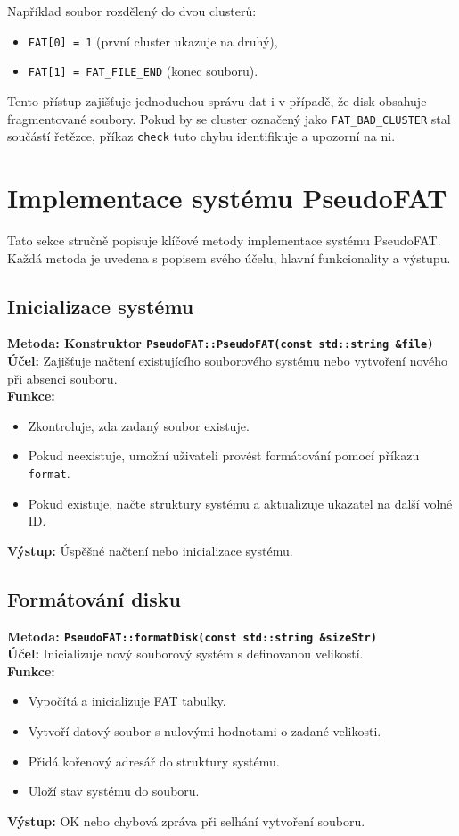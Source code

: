 \documentclass[12pt, a4paper]{article}
\begin{document}
Například soubor rozdělený do dvou clusterů:

\begin{itemize}
    \item \texttt{FAT[0] = 1} (první cluster ukazuje na druhý),
    \item \texttt{FAT[1] = FAT\_FILE\_END} (konec souboru).
\end{itemize}

Tento přístup zajišťuje jednoduchou správu dat i v případě, že disk obsahuje fragmentované soubory. Pokud by se cluster označený jako \texttt{FAT\_BAD\_CLUSTER} stal součástí řetězce, příkaz \texttt{check} tuto chybu identifikuje a upozorní na ni.

\newpage
\section{Implementace systému PseudoFAT}
Tato sekce stručně popisuje klíčové metody implementace systému PseudoFAT. Každá metoda je uvedena s popisem svého účelu, hlavní funkcionality a výstupu.

\subsection{Inicializace systému}
\textbf{Metoda: Konstruktor \texttt{PseudoFAT::PseudoFAT(const std::string \&file)}} \\
\textbf{Účel:} Zajišťuje načtení existujícího souborového systému nebo vytvoření nového při absenci souboru. \\
\textbf{Funkce:}
\begin{itemize}
    \item Zkontroluje, zda zadaný soubor existuje.
    \item Pokud neexistuje, umožní uživateli provést formátování pomocí příkazu \texttt{format}.
    \item Pokud existuje, načte struktury systému a aktualizuje ukazatel na další volné ID.
\end{itemize}
\textbf{Výstup:} Úspěšné načtení nebo inicializace systému.

\subsection{Formátování disku}
\textbf{Metoda: \texttt{PseudoFAT::formatDisk(const std::string \&sizeStr)}} \\
\textbf{Účel:} Inicializuje nový souborový systém s definovanou velikostí. \\
\textbf{Funkce:}
\begin{itemize}
    \item Vypočítá a inicializuje FAT tabulky.
    \item Vytvoří datový soubor s nulovými hodnotami o zadané velikosti.
    \item Přidá kořenový adresář do struktury systému.
    \item Uloží stav systému do souboru.
\end{itemize}
\textbf{Výstup:} OK nebo chybová zpráva při selhání vytvoření souboru.
\end{document}
